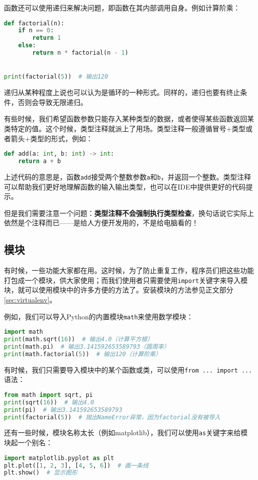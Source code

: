 \documentclass[../main.tex]{subfiles}
\begin{document}
函数还可以使用递归来解决问题，即函数在其内部调用自身。例如计算阶乘：
\begin{lstlisting}[language=python]
def factorial(n):
    if n == 0:
        return 1
    else:
        return n * factorial(n - 1)


print(factorial(5))  # 输出120
\end{lstlisting}

递归从某种程度上说也可以认为是循环的一种形式。同样的，递归也要有终止条件，否则会导致无限递归。

有些时候，我们希望函数参数只能存入某种类型的数据，或者使得某些函数返回某类特定的值。这个时候，类型注释就派上了用场。类型注释一般遵循冒号+类型或者箭头+类型的形式，例如：
\begin{lstlisting}[language=python]
def add(a: int, b: int) -> int:
    return a + b
\end{lstlisting}
上述代码的意思是，函数\texttt{add}接受两个整数参数\texttt{a}和\texttt{b}，并返回一个整数。类型注释可以帮助我们更好地理解函数的输入输出类型，也可以在IDE中提供更好的代码提示。

但是我们需要注意一个问题：\textbf{类型注释不会强制执行类型检查}，换句话说它实际上依然是个注释而已——是给人方便开发用的，不是给电脑看的！

\subsection{模块}
有时候，一些功能大家都在用。这时候，为了防止重复工作，程序员们把这些功能打包成一个模块，供大家使用；而我们使用者只需要使用\texttt{import}关键字来导入模块，就可以使用模块中的许多方便的方法了。安装模块的方法参见正文部分\ref{sec:virtualenv}。

例如，我们可以导入Python的内置模块\texttt{math}来使用数学模块：
\begin{lstlisting}[language=python]
import math
print(math.sqrt(16))  # 输出4.0（计算平方根）
print(math.pi)  # 输出3.141592653589793（圆周率）
print(math.factorial(5))  # 输出120（计算阶乘）
\end{lstlisting}

有时候，我们只需要导入模块中的某个函数或类，可以使用\texttt{from ... import ...}语法：
\begin{lstlisting}[language=python]
from math import sqrt, pi
print(sqrt(16))  # 输出4.0
print(pi)  # 输出3.141592653589793
print(factorial(5))  # 抛出NameError异常，因为factorial没有被导入
\end{lstlisting}

还有一些时候，模块名称太长（例如matplotlib），我们可以使用\texttt{as}关键字来给模块起一个别名：
\begin{lstlisting}[language=python]
import matplotlib.pyplot as plt
plt.plot([1, 2, 3], [4, 5, 6])  # 画一条线
plt.show()  # 显示图形
\end{lstlisting}
\end{document}
